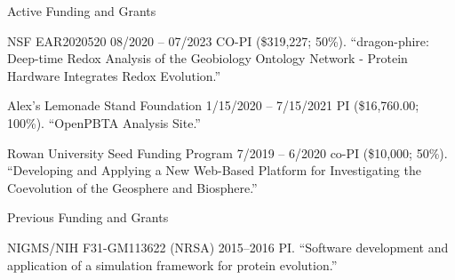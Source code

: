 \documentclass{resume} %
\begin{document}
\vspace*{0.35cm}
\begin{rSection}{Active Funding and Grants}
\vspace*{0.25cm}

\begin{rSubsection}
  {NSF EAR2020520}
  {08/2020 -- 07/2023}
  {CO-PI (\$319,227; 50\%). ``dragon-phire: Deep-time Redox Analysis of the Geobiology Ontology Network - Protein Hardware Integrates Redox Evolution.''}
\end{rSubsection}



\begin{rSubsection}
  {Alex's Lemonade Stand Foundation}
  {1/15/2020 -- 7/15/2021}
  {PI (\$16,760.00; 100\%). ``OpenPBTA Analysis Site.''}
\end{rSubsection}


\begin{rSubsection}
  {Rowan University Seed Funding Program}
  {7/2019 -- 6/2020}
  {co-PI (\$10,000; 50\%). ``Developing and Applying a New Web-Based Platform for Investigating the Coevolution of the Geosphere and Biosphere.''}
\end{rSubsection}





\vspace*{0.35cm}
\begin{rSection}{Previous Funding and Grants}
\vspace*{0.25cm}


\begin{rSubsection}
  {NIGMS/NIH F31-GM113622 (NRSA)}
  {2015--2016}
  {PI. ``Software development and application of a simulation framework for protein evolution.''}
\end{rSubsection}

\end{rSection}





\end{rSection}
\end{document}
